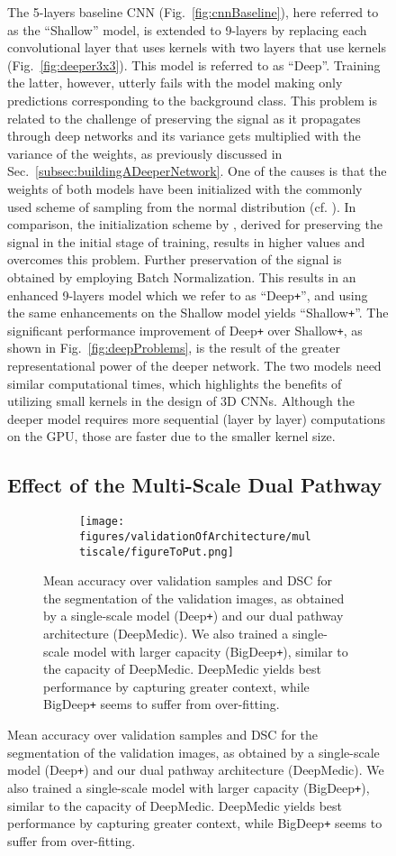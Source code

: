 \documentclass[preprint,authoryear,12pt]{elsarticle}
\newcommand{\quot}[1]{``#1''}
\begin{document}
\begin{figure}[h]
The 5-layers baseline CNN (Fig.~\ref{fig:cnnBaseline}), here referred to as the \quot{Shallow} model, is extended to 9-layers by replacing each convolutional layer that uses  kernels with two layers that use  kernels (Fig.~\ref{fig:deeper3x3}). This model is referred to as \quot{Deep}. Training the latter, however, utterly fails with the model making only predictions corresponding to the background class. This problem is related to the challenge of preserving the signal as it propagates through deep networks and its variance gets multiplied with the variance of the weights, as previously discussed in Sec.~\ref{subsec:buildingADeeperNetwork}. One of the causes is that the weights of both models have been initialized with the commonly used scheme of sampling from the normal distribution  (cf. \cite{Krizhevsky2012}). In comparison, the initialization scheme by \cite{he2015delving}, derived for preserving the signal in the initial stage of training, results in higher values and overcomes this problem. Further preservation of the signal is obtained by employing Batch Normalization. This results in an enhanced 9-layers model which we refer to as \quot{Deep\texttt{+}}, and using the same enhancements on the Shallow model yields \quot{Shallow\texttt{+}}. The significant performance improvement of Deep\texttt{+} over Shallow\texttt{+}, as shown in Fig.~\ref{fig:deepProblems}, is the result of the greater representational power of the deeper network. The two models need similar computational times, which highlights the benefits of utilizing small kernels in the design of 3D CNNs. Although the deeper model requires more sequential (layer by layer) computations on the GPU, those are faster due to the smaller kernel size.

\subsection{Effect of the Multi-Scale Dual Pathway}
\label{subsec:valMultiscale}

\begin{figure}[!h]
\centering
\begin{subfigure}[b]{0.5\textwidth}
\centering
\texttt{[image: figures/validationOfArchitecture/multiscale/figureToPut.png]}
\end{subfigure}
\caption{Mean accuracy over validation samples and DSC for the segmentation of the validation images, as obtained by a single-scale model (Deep\texttt{+}) and our dual pathway architecture (DeepMedic). We also trained a single-scale model with larger capacity (BigDeep\texttt{+}), similar to the capacity of DeepMedic. DeepMedic yields best performance by capturing greater context, while BigDeep\texttt{+} seems to suffer from over-fitting.
}
\label{fig:multiscaleExperiment}
\end{figure}
%
 

\end{figure}
\end{document}
